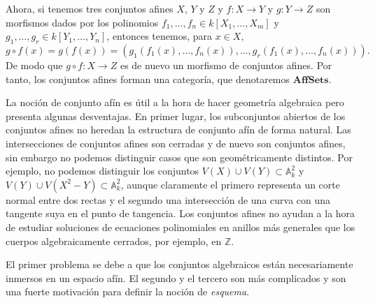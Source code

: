 \documentclass[12pt,a4paper]{article}
\theoremstyle{definition} \newtheorem{defn}[thm]{Definición}
\theoremstyle{definition} \newtheorem{ejemplo}[thm]{Ejemplo}
\theoremstyle{definition} \newtheorem{ejercicio}[thm]{Ejercicio}
\theoremstyle{remark} \newtheorem*{obs}{Observación}
\def\AA{\mathbb{A}}
\def\ZZ{\mathbb{Z}}
\begin{document}
Ahora, si tenemos tres conjuntos afines $X$, $Y$ y $Z$ y $f:X\rightarrow Y$ y $g:Y\rightarrow Z$ son morfismos dados por los polinomios $f_1,\dots,f_n\in k[X_1,\dots,X_m]$ y $g_1,\dots,g_r \in k[Y_1,\dots,Y_n]$, entonces tenemos, para $x\in X$,
\begin{equation*}
  g\circ f(x)=g(f(x))=(g_1(f_1(x),\dots,f_n(x)),\dots,g_r(f_1(x),\dots,f_n(x))).
\end{equation*}
De modo que $g\circ f:X\rightarrow Z$ es de nuevo un morfismo de conjuntos afines. Por tanto, los conjuntos afines forman una categoría, que denotaremos $\mathbf{AffSets}$.

La noción de conjunto afín es útil a la hora de hacer geometría algebraica pero presenta algunas desventajas. En primer lugar, los subconjuntos abiertos de los conjuntos afines no heredan la estructura de conjunto afín de forma natural. Las intersecciones de conjuntos afines son cerradas y de nuevo son conjuntos afines, sin embargo no podemos distinguir casos que son geométricamente distintos. Por ejemplo, no podemos distinguir los conjuntos $V(X)\cup V(Y) \subset \AA^2_k$ y $V(Y)\cup V(X^2-Y) \subset \AA^2_k$, aunque claramente el primero representa un corte normal entre dos rectas y el segundo una intersección de una curva con una tangente suya en el punto de tangencia. Los conjuntos afines no ayudan a la hora de estudiar soluciones de ecuaciones polinomiales en anillos más generales que los cuerpos algebraicamente cerrados, por ejemplo, en $\ZZ$. 

El primer problema se debe a que los conjuntos algebraicos están necesariamente inmersos en un espacio afín. El segundo y el tercero son más complicados y son una fuerte motivación para definir la noción de \emph{esquema}.
\end{document}
